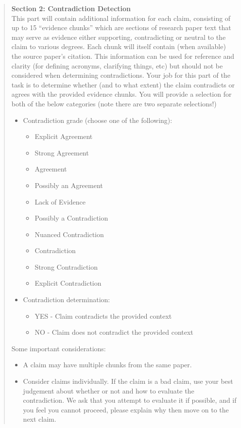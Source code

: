 \documentclass{article}
\begin{document}
\begin{quote}
\textbf{Section 2: Contradiction Detection}\\
This part will contain additional information for each claim, consisting of up to 15 ``evidence chunks'' which are sections of research paper text that may serve as evidence either supporting, contradicting or neutral to the claim to various degrees.
Each chunk will itself contain (when available) the source paper's citation. This information can be used for reference and clarity (for defining acronyms, clarifying things, etc) but should not be considered when determining contradictions.
Your job for this part of the task is to determine whether (and to what extent) the claim contradicts or agrees with the provided evidence chunks. You will provide a selection for both of the below categories (note there are two separate selections!)
\begin{itemize}
    \item Contradiction grade (choose one of the following):
        \begin{itemize}
            \item Explicit Agreement
            \item Strong Agreement
            \item Agreement
            \item Possibly an Agreement
            \item Lack of Evidence
            \item Possibly a Contradiction
            \item Nuanced Contradiction
            \item Contradiction
            \item Strong Contradiction
            \item Explicit Contradiction
        \end{itemize}
    \item Contradiction determination:
        \begin{itemize}
            \item YES - Claim contradicts the provided context
            \item NO - Claim does not contradict the provided context
        \end{itemize}
\end{itemize}
Some important considerations:
\begin{itemize}
    \item A claim may have multiple chunks from the same paper.
    \item Consider claims individually. If the claim is a bad claim, use your best judgement about whether or not and how to evaluate the contradiction. We ask that you attempt to evaluate it if possible, and if you feel you cannot proceed, please explain why then move on to the next claim.

\end{itemize}
\end{quote}
\end{document}
